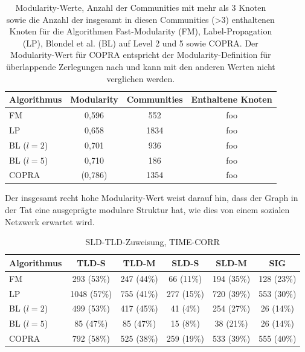 \begin{table}[h]
  \centering
  \footnotesize
  \begin{tabular}{l|c|c|c}
    Algorithmus & Modularity & Communities &
    Enthaltene Knoten \\
    \hline
    FM & 0,596 & 552 & foo \\
    LP & 0,658 & 1834 & foo \\
    BL ($l=2$)& 0,701 & 936 & foo \\
    BL ($l=5$)& 0,710 & 186 & foo \\
    COPRA & (0,786) & 1354 & foo
  \end{tabular}
  \caption{Modularity-Werte, Anzahl der Communities mit mehr als 3
    Knoten sowie die Anzahl der insgesamt in diesen Communities (>3) enthaltenen
    Knoten 
    f\"ur die Algorithmen Fast-Modularity (FM), Label-Propagation
    (LP), Blondel et al. (BL) auf Level 2 und 5 sowie COPRA. Der
    Modularity-Wert f\"ur COPRA entspricht der Modularity-Definition
    f\"ur \"uberlappende Zerlegungen nach \cite{Nicosia2009} und kann mit den anderen
    Werten nicht verglichen werden.}
  \label{tab:foo}
\end{table}

Der insgesamt recht hohe Modularity-Wert weist darauf hin, dass der
Graph in der Tat eine ausgepr\"agte modulare Struktur hat, wie dies
von einem sozialen Netzwerk erwartet wird.

\begin{table}[h]
  \centering
  \footnotesize
  \begin{tabular}{l|c|c|c|c|c}
    Algorithmus & TLD-S & TLD-M & SLD-S & SLD-M & SIG \\
    \hline
    FM & 293 (53\%) & 247 (44\%) & 66 (11\%) & 194 (35\%) & 128
    (23\%) \\
    \hline
    LP & 1048 (57\%) & 755 (41\%) & 277 (15\%) & 720 (39\%) &
    553 (30\%) \\
    \hline
    BL ($l=2$) & 499 (53\%) & 417 (45\%) & 41 (4\%) & 254 (27\%) & 26
    (14\%) \\
    \hline
    BL ($l=5$) & 85 (47\%) & 85 (47\%) & 15 (8\%) & 38 (21\%) & 26
    (14\%) \\
    \hline
    COPRA & 792 (58\%) & 525 (38\%) & 259 (19\%) & 533 (39\%) & 555 (40\%)

  \end{tabular}
  \caption{SLD-TLD-Zuweisung, TIME-CORR}
  \label{tab:assign}
\end{table}

